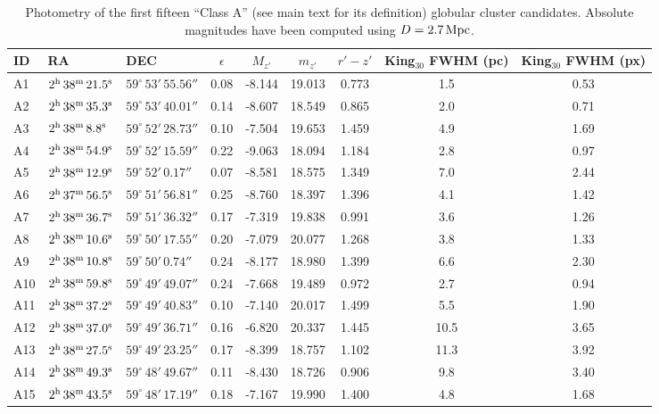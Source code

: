\documentclass[useAMS,usenatbib]{mn2e}
\begin{document}
\lipsum[1]



\begin{table}
 \centering
 \caption{Photometry of the first fifteen ``Class A'' (see main text for its definition) globular cluster candidates. Absolute magnitudes have been computed using $D = 2.7\,\rm{Mpc}$.}
\label{tab:class_a}  
\begin{tabular}{lllcccccc}
	\hline
	ID & RA & DEC & $\epsilon$ & $M_{z'}$ & $m_{z'}$ & $r'-z'$ & King$_{30}$ FWHM (pc) & King$_{30}$ FWHM (px) \\
	\hline
	A1 & $2^{\rm{h}}\,38^{\rm{m}}\,21.5^{\rm{s}}$ & $59^\circ\,53'\,55.56''$ & 0.08 & -8.144 & 19.013 & 0.773 & 1.5 & 0.53 \\
	A2 & $2^{\rm{h}}\,38^{\rm{m}}\,35.3^{\rm{s}}$ & $59^\circ\,53'\,40.01''$ & 0.14 & -8.607 & 18.549 & 0.865 & 2.0 & 0.71 \\
	A3 & $2^{\rm{h}}\,38^{\rm{m}}\,8.8^{\rm{s}}$ & $59^\circ\,52'\,28.73''$ & 0.10 & -7.504 & 19.653 & 1.459 & 4.9 & 1.69 \\
	A4 & $2^{\rm{h}}\,38^{\rm{m}}\,54.9^{\rm{s}}$ & $59^\circ\,52'\,15.59''$ & 0.22 & -9.063 & 18.094 & 1.184 & 2.8 & 0.97 \\
	A5 & $2^{\rm{h}}\,38^{\rm{m}}\,12.9^{\rm{s}}$ & $59^\circ\,52'\,0.17''$ & 0.07 & -8.581 & 18.575 & 1.349 & 7.0 & 2.44 \\
	A6 & $2^{\rm{h}}\,37^{\rm{m}}\,56.5^{\rm{s}}$ & $59^\circ\,51'\,56.81''$ & 0.25 & -8.760 & 18.397 & 1.396 & 4.1 & 1.42 \\
	A7 & $2^{\rm{h}}\,38^{\rm{m}}\,36.7^{\rm{s}}$ & $59^\circ\,51'\,36.32''$ & 0.17 & -7.319 & 19.838 & 0.991 & 3.6 & 1.26 \\
	A8 & $2^{\rm{h}}\,38^{\rm{m}}\,10.6^{\rm{s}}$ & $59^\circ\,50'\,17.55''$ & 0.20 & -7.079 & 20.077 & 1.268 & 3.8 & 1.33 \\
	A9 & $2^{\rm{h}}\,38^{\rm{m}}\,10.8^{\rm{s}}$ & $59^\circ\,50'\,0.74''$ & 0.24 & -8.177 & 18.980 & 1.399 & 6.6 & 2.30 \\
	A10 & $2^{\rm{h}}\,38^{\rm{m}}\,59.8^{\rm{s}}$ & $59^\circ\,49'\,49.07''$ & 0.24 & -7.668 & 19.489 & 0.972 & 2.7 & 0.94 \\
	A11 & $2^{\rm{h}}\,38^{\rm{m}}\,37.2^{\rm{s}}$ & $59^\circ\,49'\,40.83''$ & 0.10 & -7.140 & 20.017 & 1.499 & 5.5 & 1.90 \\
	A12 & $2^{\rm{h}}\,38^{\rm{m}}\,37.0^{\rm{s}}$ & $59^\circ\,49'\,36.71''$ & 0.16 & -6.820 & 20.337 & 1.445 & 10.5 & 3.65 \\
	A13 & $2^{\rm{h}}\,38^{\rm{m}}\,27.5^{\rm{s}}$ & $59^\circ\,49'\,23.25''$ & 0.17 & -8.399 & 18.757 & 1.102 & 11.3 & 3.92 \\
	A14 & $2^{\rm{h}}\,38^{\rm{m}}\,49.3^{\rm{s}}$ & $59^\circ\,48'\,49.67''$ & 0.11 & -8.430 & 18.726 & 0.906 & 9.8 & 3.40 \\
	A15 & $2^{\rm{h}}\,38^{\rm{m}}\,43.5^{\rm{s}}$ & $59^\circ\,48'\,17.19''$ & 0.18 & -7.167 & 19.990 & 1.400 & 4.8 & 1.68 \\
	\hline
\end{tabular}
\end{table}
\end{document}
